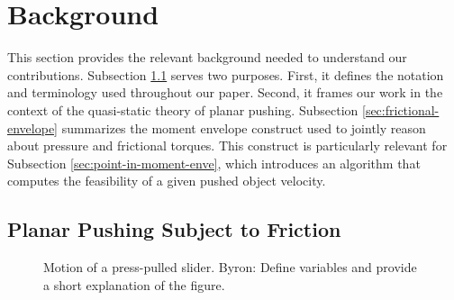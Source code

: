\documentclass[conference]{IEEEtran}
\newcommand{\BB}[1]{{\color{red} {Byron: {#1}}}}
\begin{document}
\section{Background}\label{sec:background}
This section provides the relevant background needed to understand our
contributions. Subsection \ref{sec:plan-push-subj} serves two
purposes. First, it defines the notation and terminology used
throughout our paper. Second, it frames our work in the context of the
quasi-static theory of planar pushing. Subsection
\ref{sec:frictional-envelope} summarizes the moment envelope construct
used to jointly reason about pressure and frictional torques. This
construct is particularly relevant for Subsection
\ref{sec:point-in-moment-enve}, which introduces an algorithm that
computes the feasibility of a given pushed object velocity.




\subsection{Planar Pushing Subject to Friction}\label{sec:plan-push-subj}

\begin{figure}[t]
  \centering
  \def\iangle{35} %
  \caption{Motion of a press-pulled slider. \BB{Define variables and provide a short explanation of the figure.}}
  \label{fig:presspull-motion}
\end{figure}
\end{document}
